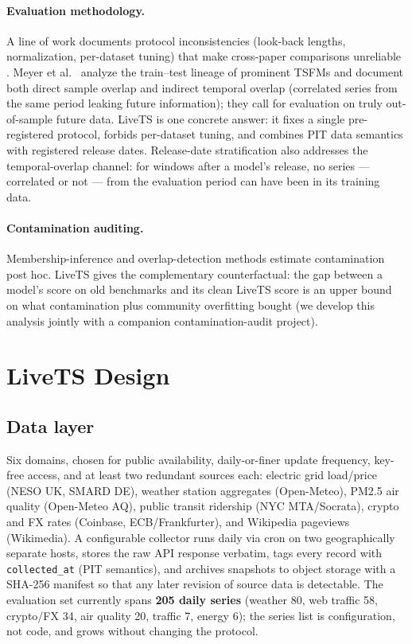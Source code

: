 \documentclass{article}
\begin{document}
\paragraph{Evaluation methodology.} A line of work documents protocol inconsistencies (look-back lengths, normalization, per-dataset tuning) that make cross-paper comparisons unreliable \citep{meyer2025leakage}. Meyer et al.\ \citep{meyer2025leakage} analyze the train--test lineage of prominent TSFMs and document both direct sample overlap and indirect temporal overlap (correlated series from the same period leaking future information); they call for evaluation on truly out-of-sample future data. LiveTS is one concrete answer: it fixes a single pre-registered protocol, forbids per-dataset tuning, and combines PIT data semantics with registered release dates. Release-date stratification also addresses the temporal-overlap channel: for windows after a model's release, no series --- correlated or not --- from the evaluation period can have been in its training data.

\paragraph{Contamination auditing.} Membership-inference and overlap-detection methods estimate contamination post hoc. LiveTS gives the complementary counterfactual: the gap between a model's score on old benchmarks and its clean LiveTS score is an upper bound on what contamination plus community overfitting bought (we develop this analysis jointly with a companion contamination-audit project).

\section{LiveTS Design}\label{sec:design}

\subsection{Data layer}

Six domains, chosen for public availability, daily-or-finer update frequency, key-free access, and at least two redundant sources each: electric grid load/price (NESO UK, SMARD DE), weather station aggregates (Open-Meteo), PM2.5 air quality (Open-Meteo AQ), public transit ridership (NYC MTA/Socrata), crypto and FX rates (Coinbase, ECB/Frankfurter), and Wikipedia pageviews (Wikimedia). A configurable collector runs daily via cron on two geographically separate hosts, stores the raw API response verbatim, tags every record with \texttt{collected\_at} (PIT semantics), and archives snapshots to object storage with a SHA-256 manifest so that any later revision of source data is detectable. The evaluation set currently spans \textbf{205 daily series} (weather 80, web traffic 58, crypto/FX 34, air quality 20, traffic 7, energy 6); the series list is configuration, not code, and grows without changing the protocol.
\end{document}

